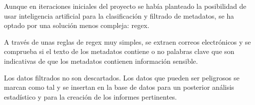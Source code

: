 Aunque en iteraciones iniciales del proyecto se había planteado la posibilidad de usar inteligencia artificial para la clasificación y filtrado de metadatos, se ha optado por una solución menos compleja: regex.

A través de unas reglas de regex muy simples, se extraen correos electrónicos y se comprueba si el texto de los metadatos contiene o no palabras clave que son indicativas de que los metadatos contienen información sensible.

Los datos filtrados no son descartados. Los datos que pueden ser peligrosos se marcan como tal y se insertan en la base de datos para un posterior análisis estadístico y para la creación de los informes pertinentes.